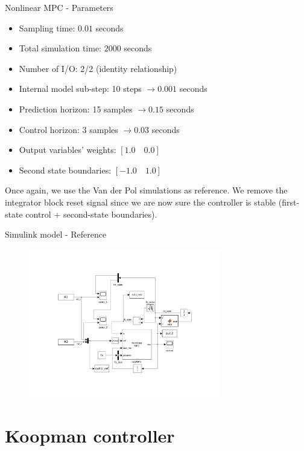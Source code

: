 \documentclass{beamer}
\begin{document}
\begin{frame}{Nonlinear MPC - Parameters}
    \begin{itemize}
        \item Sampling time: $0.01$ seconds
        \item Total simulation time: $2000$ seconds
        \item Number of I/O: 2/2 (identity relationship)
        \item Internal model sub-step: 10 steps $\rightarrow 0.001$ seconds
        \item Prediction horizon: 15 samples $\rightarrow 0.15$ seconds
        \item Control horizon: 3 samples $\rightarrow 0.03$ seconds
        \item Output variables' weights: $\left[1.0 \quad 0.0\right]$
        \item Second state boundaries: $\left[-1.0 \quad 1.0\right]$
    \end{itemize}

    Once again, we use the Van der Pol simulations as reference. We remove the integrator block reset signal since we are now sure the controller is stable (first-state control + second-state boundaries).
\end{frame}

\begin{frame}{Simulink model - Reference}
    \begin{figure}
        \centering
        \includegraphics[width=0.75\textwidth]{Simulink_VDP.png}
    \end{figure}
\end{frame}


\section{Koopman controller}
\end{document}

